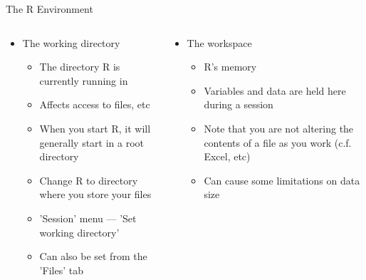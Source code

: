 \documentclass[aspectratio=169]{beamer}\usepackage[]{graphicx}\usepackage[]{color}
\begin{document}
% 
\begin{frame}{The R Environment}
\begin{columns}
	\begin{column}{0.5\textwidth}
  \begin{itemize}
		\item The working directory
    \begin{itemize}
      \item The directory R is currently running in
      \item Affects access to files, etc
  		\item When you start R, it will generally start in a root directory
      \item Change R to directory where you store your files
      \item 'Session' menu --- 'Set working directory'
      \item Can also be set from the 'Files' tab

    \end{itemize}
	\end{itemize}
	\end{column}
	\begin{column}{0.5\textwidth}
	\begin{itemize}
		\item<2-> The workspace
    \begin{itemize}
      \item<2-> R's memory
      \item<2-> Variables and data are held here during a session
      \item<2-> Note that you are not altering the contents of a file as you work (c.f. Excel, etc)
      \item<2-> Can cause some limitations on data size
    \end{itemize}
	\end{itemize}
	\end{column}
\end{columns}

\end{frame}
\end{document}
